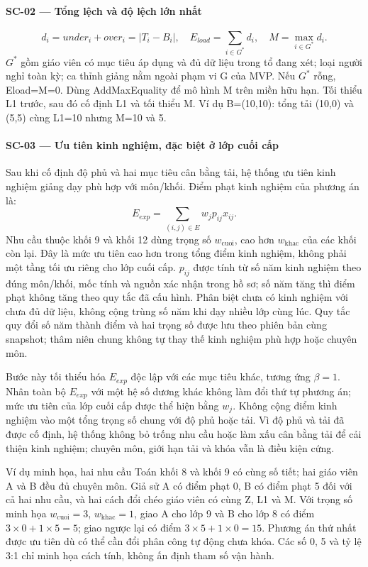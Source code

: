 \documentclass[12pt,a4paper]{report}
\begin{document}
\paragraph{SC-02 --- Tổng lệch và độ lệch lớn nhất}
\[
d_i=under_i+over_i=|T_i-B_i|,\quad E_{load}=\sum_{i\in G^*}d_i,\quad M=\max_{i\in G^*}d_i.
\]
$G^*$ gồm giáo viên có mục tiêu áp dụng và đủ dữ liệu trong tổ đang xét; loại người nghỉ toàn kỳ; ca thỉnh giảng nằm ngoài phạm vi G của MVP. Nếu $G^*$ rỗng, Eload=M=0. Dùng AddMaxEquality để mô hình M trên miền hữu hạn. Tối thiểu L1 trước, sau đó cố định L1 và tối thiểu M. Ví dụ B=(10,10): tổng tải (10,0) và (5,5) cùng L1=10 nhưng M=10 và 5.

\paragraph{SC-03 --- Ưu tiên kinh nghiệm, đặc biệt ở lớp cuối cấp}
Sau khi cố định độ phủ và hai mục tiêu cân bằng tải, hệ thống ưu tiên kinh nghiệm giảng dạy phù hợp với môn/khối. Điểm phạt kinh nghiệm của phương án là:
\[
E_{exp}=\sum_{(i,j)\in E}w_jp_{ij}x_{ij}.
\]
Nhu cầu thuộc khối 9 và khối 12 dùng trọng số $w_{\mathrm{cuoi}}$, cao hơn $w_{\mathrm{khac}}$ của các khối còn lại. Đây là mức ưu tiên cao hơn trong tổng điểm kinh nghiệm, không phải một tầng tối ưu riêng cho lớp cuối cấp. $p_{ij}$ được tính từ số năm kinh nghiệm theo đúng môn/khối, mốc tính và nguồn xác nhận trong hồ sơ; số năm tăng thì điểm phạt không tăng theo quy tắc đã cấu hình. Phân biệt chưa có kinh nghiệm với chưa đủ dữ liệu, không cộng trùng số năm khi dạy nhiều lớp cùng lúc. Quy tắc quy đổi số năm thành điểm và hai trọng số được lưu theo phiên bản cùng snapshot; thâm niên chung không tự thay thế kinh nghiệm phù hợp hoặc chuyên môn.

Bước này tối thiểu hóa $E_{exp}$ độc lập với các mục tiêu khác, tương ứng $\beta=1$. Nhân toàn bộ $E_{exp}$ với một hệ số dương khác không làm đổi thứ tự phương án; mức ưu tiên của lớp cuối cấp được thể hiện bằng $w_j$. Không cộng điểm kinh nghiệm vào một tổng trọng số chung với độ phủ hoặc tải. Vì độ phủ và tải đã được cố định, hệ thống không bỏ trống nhu cầu hoặc làm xấu cân bằng tải để cải thiện kinh nghiệm; chuyên môn, giới hạn tải và khóa vẫn là điều kiện cứng.

Ví dụ minh họa, hai nhu cầu Toán khối 8 và khối 9 có cùng số tiết; hai giáo viên A và B đều đủ chuyên môn. Giả sử A có điểm phạt 0, B có điểm phạt 5 đối với cả hai nhu cầu, và hai cách đổi chéo giáo viên có cùng Z, L1 và M. Với trọng số minh họa $w_{\mathrm{cuoi}}=3$, $w_{\mathrm{khac}}=1$, giao A cho lớp 9 và B cho lớp 8 có điểm $3\times0+1\times5=5$; giao ngược lại có điểm $3\times5+1\times0=15$. Phương án thứ nhất được ưu tiên dù có thể cần đổi phân công tự động chưa khóa. Các số 0, 5 và tỷ lệ 3:1 chỉ minh họa cách tính, không ấn định tham số vận hành.
\end{document}
